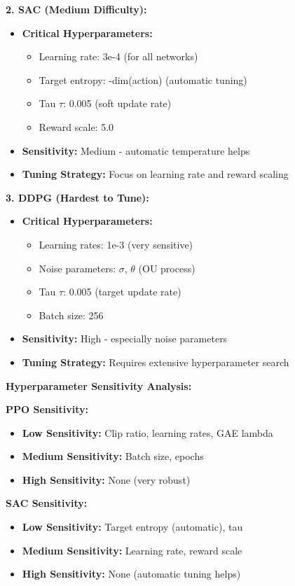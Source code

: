 \documentclass[12pt]{article}
\begin{document}
{{{\textbf{2. SAC (Medium Difficulty):}
\begin{itemize}
    \item \textbf{Critical Hyperparameters:}
    \begin{itemize}
        \item Learning rate: 3e-4 (for all networks)
        \item Target entropy: -dim(action) (automatic tuning)
        \item Tau $\tau$: 0.005 (soft update rate)
        \item Reward scale: 5.0
    \end{itemize}
    \item \textbf{Sensitivity:} Medium - automatic temperature helps
    \item \textbf{Tuning Strategy:} Focus on learning rate and reward scaling
\end{itemize}

\textbf{3. DDPG (Hardest to Tune):}
\begin{itemize}
    \item \textbf{Critical Hyperparameters:}
    \begin{itemize}
        \item Learning rates: 1e-3 (very sensitive)
        \item Noise parameters: $\sigma$, $\theta$ (OU process)
        \item Tau $\tau$: 0.005 (target update rate)
        \item Batch size: 256
    \end{itemize}
    \item \textbf{Sensitivity:} High - especially noise parameters
    \item \textbf{Tuning Strategy:} Requires extensive hyperparameter search
\end{itemize}

\textbf{Hyperparameter Sensitivity Analysis:}

\textbf{PPO Sensitivity:}
\begin{itemize}
    \item \textbf{Low Sensitivity:} Clip ratio, learning rates, GAE lambda
    \item \textbf{Medium Sensitivity:} Batch size, epochs
    \item \textbf{High Sensitivity:} None (very robust)
\end{itemize}

\textbf{SAC Sensitivity:}
\begin{itemize}
    \item \textbf{Low Sensitivity:} Target entropy (automatic), tau
    \item \textbf{Medium Sensitivity:} Learning rate, reward scale
    \item \textbf{High Sensitivity:} None (automatic tuning helps)
\end{itemize}

}}}
\end{document}
